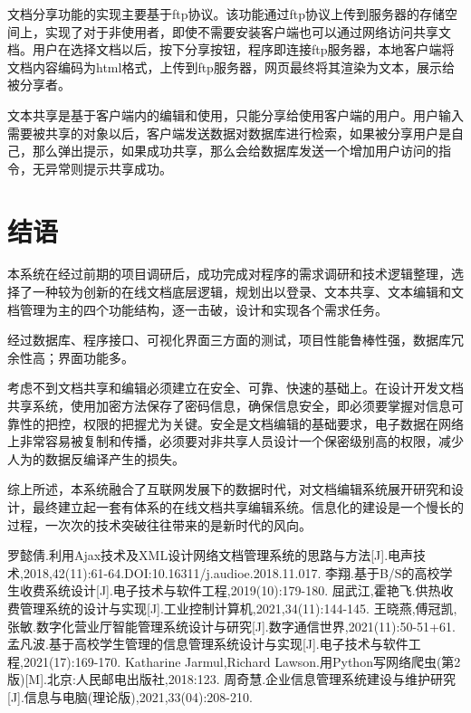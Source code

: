 \documentclass[forprint]{software}
\begin{document}
文档分享功能的实现主要基于ftp协议。该功能通过ftp协议上传到服务器的存储空间上，实现了对于非使用者，即使不需要安装客户端也可以通过网络访问共享文档。用户在选择文档以后，按下分享按钮，程序即连接ftp服务器，本地客户端将文档内容编码为html格式，上传到ftp服务器，网页最终将其渲染为文本，展示给被分享者。

文本共享是基于客户端内的编辑和使用，只能分享给使用客户端的用户。用户输入需要被共享的对象以后，客户端发送数据对数据库进行检索，如果被分享用户是自己，那么弹出提示，如果成功共享，那么会给数据库发送一个增加用户访问的指令，无异常则提示共享成功。

\chapter{结语}

本系统在经过前期的项目调研后，成功完成对程序的需求调研和技术逻辑整理，选择了一种较为创新的在线文档底层逻辑，规划出以登录、文本共享、文本编辑和文档管理为主的四个功能结构，逐一击破，设计和实现各个需求任务。

经过数据库、程序接口、可视化界面三方面的测试，项目性能鲁棒性强，数据库冗余性高；界面功能多。

考虑不到文档共享和编辑必须建立在安全、可靠、快速的基础上。在设计开发文档共享系统，使用加密方法保存了密码信息，确保信息安全，即必须要掌握对信息可靠性的把控，权限的把握尤为关键。安全是文档编辑的基础要求，电子数据在网络上非常容易被复制和传播，必须要对非共享人员设计一个保密级别高的权限，减少人为的数据反编译产生的损失。

综上所述，本系统融合了互联网发展下的数据时代，对文档编辑系统展开研究和设计，最终建立起一套有体系的在线文档共享编辑系统。信息化的建设是一个慢长的过程，一次次的技术突破往往带来的是新时代的风向。

\clearpage
\cleardoublepage{}
{}
\begin{thebibliography}{99}

  罗懿倩.利用Ajax技术及XML设计网络文档管理系统的思路与方法[J].电声技术,2018,42(11):61-64.DOI:10.16311/j.audioe.2018.11.017.
  李翔.基于B/S的高校学生收费系统设计[J].电子技术与软件工程,2019(10):179-180.
  屈武江,霍艳飞.供热收费管理系统的设计与实现[J].工业控制计算机,2021,34(11):144-145.
  王晓燕,傅冠凯,张敏.数字化营业厅智能管理系统设计与研究[J].数字通信世界,2021(11):50-51+61.
  孟凡波.基于高校学生管理的信息管理系统设计与实现[J].电子技术与软件工程,2021(17):169-170.
  Katharine Jarmul,Richard Lawson.用Python写网络爬虫(第2版)[M].北京:人民邮电出版社,2018:123.
  周奇慧.企业信息管理系统建设与维护研究[J].信息与电脑(理论版),2021,33(04):208-210.
  
\end{thebibliography}
\end{document}
